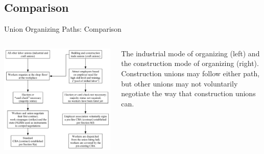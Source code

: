 \documentclass{beamer}
\begin{document}
\subsection{Comparison}
\begin{frame}{Union Organizing Paths: Comparison}
  \begin{columns}
    \includegraphics[width=0.9\linewidth]{../images/organizing_paths}

    The industrial mode of organizing (left) and the construction mode of organizing (right).\newline\newline
    Construction unions may follow either path, but other unions may not voluntarily negotiate the way that construction unions can.
    \end{columns}
\end{frame}
\end{document}

